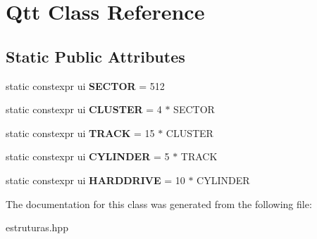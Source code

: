 \hypertarget{classQtt}{}\section{Qtt Class Reference}
\label{classQtt}
\subsection*{Static Public Attributes}
\begin{DoxyCompactItemize}
\item 
static constexpr ui {\bfseries S\+E\+C\+T\+OR} = 512\hypertarget{classQtt_a177e5a4df6a1fa166aacd96ff690280c}{}\label{classQtt_a177e5a4df6a1fa166aacd96ff690280c}

\item 
static constexpr ui {\bfseries C\+L\+U\+S\+T\+ER} = 4 $\ast$ S\+E\+C\+T\+OR\hypertarget{classQtt_a2a7a98fbf047bb63bd55678f8633ab94}{}\label{classQtt_a2a7a98fbf047bb63bd55678f8633ab94}

\item 
static constexpr ui {\bfseries T\+R\+A\+CK} = 15 $\ast$ C\+L\+U\+S\+T\+ER\hypertarget{classQtt_af3bc3ac1337b451d2874b25ab097e099}{}\label{classQtt_af3bc3ac1337b451d2874b25ab097e099}

\item 
static constexpr ui {\bfseries C\+Y\+L\+I\+N\+D\+ER} = 5 $\ast$ T\+R\+A\+CK\hypertarget{classQtt_a978f12a5bb314b193446ea6f64edad85}{}\label{classQtt_a978f12a5bb314b193446ea6f64edad85}

\item 
static constexpr ui {\bfseries H\+A\+R\+D\+D\+R\+I\+VE} = 10 $\ast$ C\+Y\+L\+I\+N\+D\+ER\hypertarget{classQtt_ac85fa07393a2f59111cf9f45d4c05f0b}{}\label{classQtt_ac85fa07393a2f59111cf9f45d4c05f0b}

\end{DoxyCompactItemize}


The documentation for this class was generated from the following file\+:\begin{DoxyCompactItemize}
\item 
estruturas.\+hpp\end{DoxyCompactItemize}
